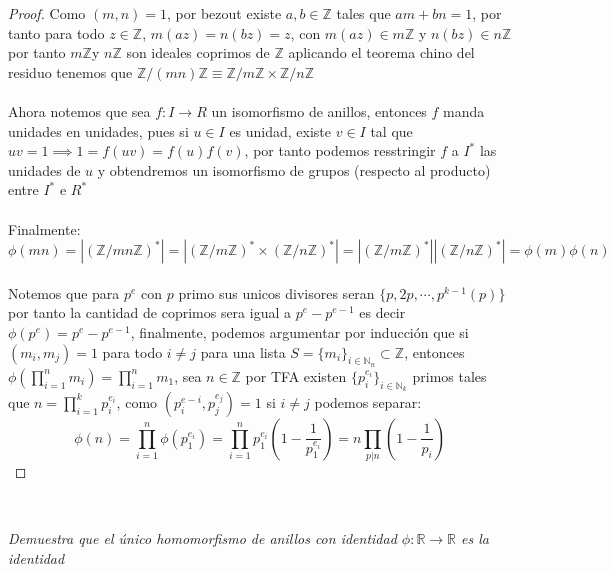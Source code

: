 \documentclass[11pt,letterpaper]{article}
\newcommand{\R}{\mathbb{R}}
\newcommand{\N}{\mathbb{N}}
\newcommand{\Z}{\mathbb{Z}}
\begin{document}
\begin{proof}
    Como $(m,n)=1$, por bezout existe $a,b\in \Z$ tales que $am+bn=1$, por tanto para todo $z\in \Z$, $m(az)=n(bz)=z$, con $m(az)\in m\Z$ y $n(bz)\in n\Z$ por tanto $m\Z$y $n\Z$ son ideales coprimos de $\Z$ aplicando
    el teorema chino del residuo tenemos que $\Z/ (mn)\Z\equiv\Z/m\Z\times \Z/n\Z$\,\\
    \,\\
    Ahora notemos que sea $f:I\to R$ un isomorfismo de anillos, entonces $f$ manda unidades en unidades, pues si $u\in I$ es unidad, existe $v\in I$ tal que
    $uv=1\implies 1=f(uv)=f(u)f(v)$, por tanto podemos resstringir $f$ a $I^{*}$ las unidades de $u$ y obtendremos un isomorfismo de grupos (respecto al producto) entre $I^*$ e $R^*$\,\\
    \,\\
    Finalmente:\,\\
    \begin{equation*}
        \phi(mn)=|(\Z/mn\Z)^*|=|(\Z/m\Z)^*\times (\Z/n\Z)^*|=|(\Z/m\Z)^*||(\Z/n\Z)^*|=\phi(m)\phi(n)
    \end{equation*}\,\\
    Notemos que para $p^{e}$ con $p$ primo sus unicos divisores seran $\{p,2p,\cdots,p^{k-1}(p)\}$ por tanto la cantidad de coprimos sera igual a $p^{e}-p^{e-1}$ es decir $\phi(p^e)=p^{e}-p^{e-1}$, finalmente, podemos
    argumentar por inducci\'on que si $(m_i,m_j)=1$ para todo $i\neq j$ para una lista $S=\{m_i\}_{i\in \N_n}\subset \Z$, entonces $\phi(\prod_{i=1}^n m_i)=\prod_{i=1}^n m_1$, sea $n\in \Z$ por TFA
    existen $\{p_i^{e_i}\}_{i\in \N_k}$ primos tales que $n=\prod_{i=1}^{k}p_i^{e_i}$, como $(p_i^{e-i},p_j^{e_j})=1$ si $i\neq j$ podemos separar:\,\\
    \begin{equation*}
        \phi(n)=\prod_{i=1}^{n}\phi(p_1^{e_i})=\prod_{i=1}^{n}p_1^{e_i}\left(1-\frac{1}{p_1^{e_i}}\right)=n\prod_{p|n}\left(1-\frac{1}{p_i}\right)
    \end{equation*}
\end{proof}\,\\
\begin{tcolorbox}[
	title = \textcolor{black}{\textcolor{white}{Problema 2}},]
\textit{Demuestra que el \'unico homomorfismo de anillos con identidad $\phi:\R\to \R$ es la identidad
}
\end{tcolorbox}
\end{document}

